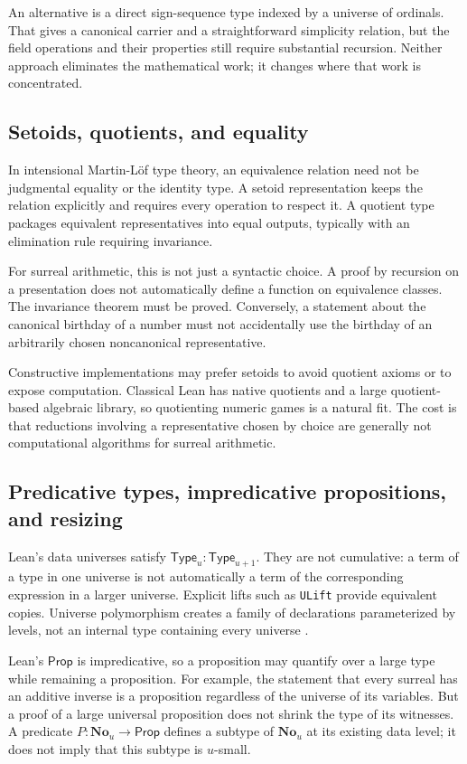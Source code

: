 \documentclass[11pt,letterpaper]{article}
\numberwithin{equation}{section}
\theoremstyle{definition}
\theoremstyle{remark}
\newcommand{\No}{\mathbf{No}}
\newcommand{\Type}{\mathsf{Type}}
\newcommand{\Prop}{\mathsf{Prop}}
\begin{document}
An alternative is a direct sign-sequence type indexed by a universe of ordinals. That gives a canonical carrier and a straightforward simplicity relation, but the field operations and their properties still require substantial recursion. Neither approach eliminates the mathematical work; it changes where that work is concentrated.

\subsection{Setoids, quotients, and equality}
In intensional Martin-L\"of type theory, an equivalence relation need not be judgmental equality or the identity type. A setoid representation keeps the relation explicitly and requires every operation to respect it. A quotient type packages equivalent representatives into equal outputs, typically with an elimination rule requiring invariance.

For surreal arithmetic, this is not just a syntactic choice. A proof by recursion on a presentation does not automatically define a function on equivalence classes. The invariance theorem must be proved. Conversely, a statement about the canonical birthday of a number must not accidentally use the birthday of an arbitrarily chosen noncanonical representative.

Constructive implementations may prefer setoids to avoid quotient axioms or to expose computation. Classical Lean has native quotients and a large quotient-based algebraic library, so quotienting numeric games is a natural fit. The cost is that reductions involving a representative chosen by choice are generally not computational algorithms for surreal arithmetic.

\subsection{Predicative types, impredicative propositions, and resizing}
Lean's data universes satisfy $\Type_u:\Type_{u+1}$. They are not cumulative: a term of a type in one universe is not automatically a term of the corresponding expression in a larger universe. Explicit lifts such as \texttt{ULift} provide equivalent copies. Universe polymorphism creates a family of declarations parameterized by levels, not an internal type containing every universe \cite{LeanUniverses}.

Lean's $\Prop$ is impredicative, so a proposition may quantify over a large type while remaining a proposition. For example, the statement that every surreal has an additive inverse is a proposition regardless of the universe of its variables. But a proof of a large universal proposition does not shrink the type of its witnesses. A predicate $P:\No_u\to\Prop$ defines a subtype of $\No_u$ at its existing data level; it does not imply that this subtype is $u$-small.
\end{document}
